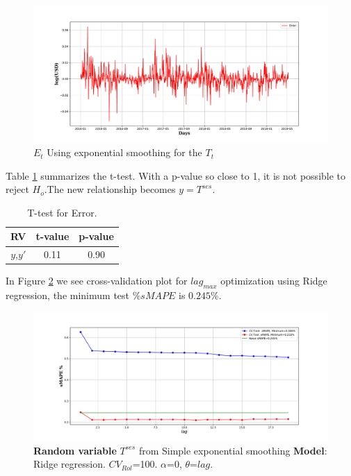 \begin{figure}[htpb!] %
	\centering %
	\includegraphics[width=\textwidth]{data/Residual_error_u_SES.pdf} %
	\caption{$E_{t}$ Using exponential smoothing for the $T_{t}$} %
	\label{fig:tren_simple_exp_error} %
\end{figure}

Table \ref{table:t_test_sms_error} summarizes the t-test. With a p-value so close to 1, it is not possible to reject $H_{o}$.The new relationship becomes $y=T^{ses}$.

\begin{table}[h!]
	\begin{center}
		\begin{tabular}{||c c c||} 
			\hline
			RV & t-value & p-value \\ [0.5ex] 
			\hline\hline
			$y$,$y'$ & 0.11 & 0.90  \\ 
			\hline
		\end{tabular}
		\caption{T-test for Error.}
		\label{table:t_test_sms_error}
	\end{center}
\end{table}


In Figure \ref{fig:trendses} we see cross-validation plot for $lag_{max}$ optimization using Ridge regression, the minimum test $\%sMAPE$ is $0.245\%$. 

\begin{figure}[htpb!] %
	\centering %
	\includegraphics[width=\textwidth]{data/trend_ses.pdf} 
	\caption{\textbf{Random variable} $T^{ses}$ from Simple exponential smoothing \textbf{Model}: Ridge regression. \textbf{$CV_{Rol}$}=100. $\alpha$=0, $\theta$=$lag$.  } 
	\label{fig:trendses} %
\end{figure}

